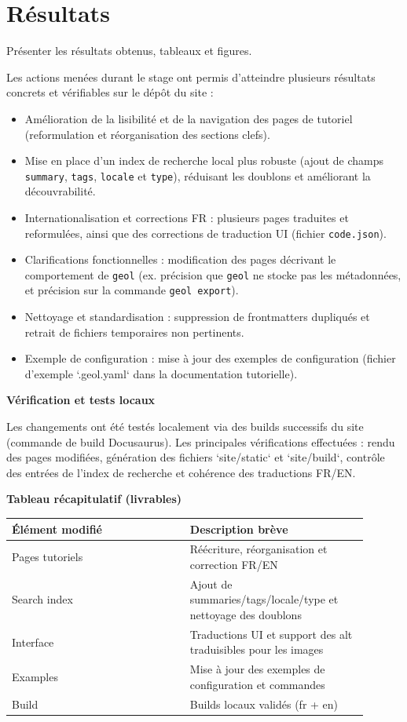 \documentclass[12pt,a4paper]{report}
\begin{document}
\chapter{Résultats}
Présenter les résultats obtenus, tableaux et figures.

Les actions menées durant le stage ont permis d'atteindre plusieurs résultats concrets et vérifiables sur le dépôt du site :

\begin{itemize}
  \item Amélioration de la lisibilité et de la navigation des pages de tutoriel (reformulation et réorganisation des sections clefs).
  \item Mise en place d'un index de recherche local plus robuste (ajout de champs \texttt{summary}, \texttt{tags}, \texttt{locale} et \texttt{type}), réduisant les doublons et améliorant la découvrabilité.
  \item Internationalisation et corrections FR : plusieurs pages traduites et reformulées, ainsi que des corrections de traduction UI (fichier \texttt{code.json}).
  \item Clarifications fonctionnelles : modification des pages décrivant le comportement de \texttt{geol} (ex. précision que \texttt{geol} ne stocke pas les métadonnées, et précision sur la commande \texttt{geol export}).
  \item Nettoyage et standardisation : suppression de frontmatters dupliqués et retrait de fichiers temporaires non pertinents.
  \item Exemple de configuration : mise à jour des exemples de configuration (fichier d'exemple `.geol.yaml` dans la documentation tutorielle).
\end{itemize}

\bigskip
\noindent \textbf{Vérification et tests locaux}

Les changements ont été testés localement via des builds successifs du site (commande de build Docusaurus). Les principales vérifications effectuées : rendu des pages modifiées, génération des fichiers `site/static` et `site/build`, contrôle des entrées de l'index de recherche et cohérence des traductions FR/EN.

\bigskip
\noindent \textbf{Tableau récapitulatif (livrables)}

\begin{center}
\begin{tabular}{p{0.45\linewidth} p{0.45\linewidth}}
\toprule
Élément modifié & Description brève \\
\midrule
Pages tutoriels & Réécriture, réorganisation et correction FR/EN \\
Search index & Ajout de summaries/tags/locale/type et nettoyage des doublons \\
Interface & Traductions UI et support des alt traduisibles pour les images \\
Examples & Mise à jour des exemples de configuration et commandes \\
Build & Builds locaux validés (fr + en) \\
\bottomrule
\end{tabular}
\end{center}
\end{document}
